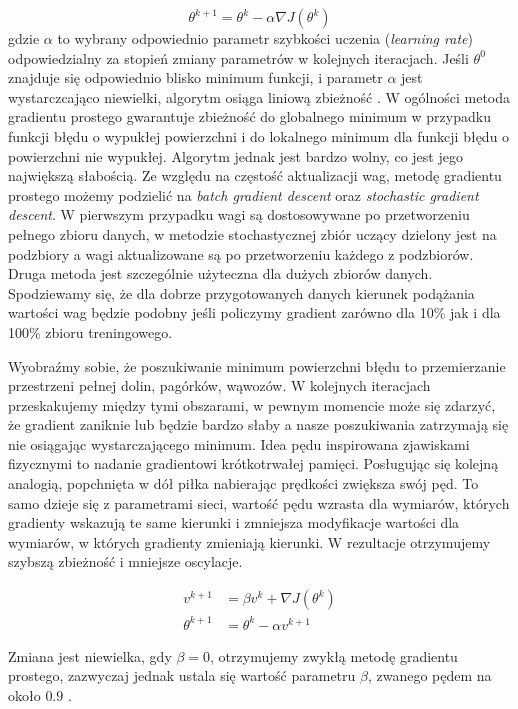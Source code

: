 \documentclass[11pt]{book}
\theoremstyle{definition}
\begin{document}
\begin{equation}
\theta^{k+1} = \theta^{k} - \alpha \nabla J(\theta^{k})
\end{equation}
gdzie $\alpha$ to wybrany odpowiednio parametr szybkości uczenia (\textit{learning rate}) odpowiedzialny za stopień zmiany parametrów w kolejnych iteracjach. Jeśli $\theta^0$ znajduje się odpowiednio blisko minimum funkcji, i parametr $\alpha$ jest wystarczcająco niewielki, algorytm osiąga liniową zbieżność \cite{Dennis:1996:NMU:1096889}. W ogólności metoda gradientu prostego gwarantuje zbieżność do globalnego minimum w przypadku funkcji błędu o wypukłej powierzchni i do lokalnego minimum dla funkcji błędu o powierzchni nie wypukłej. Algorytm jednak jest bardzo wolny, co jest jego największą słabością. Ze względu na częstość aktualizacji wag, metodę gradientu prostego możemy podzielić na \textit{batch gradient descent} oraz \textit{stochastic gradient descent}. W pierwszym przypadku wagi są dostosowywane po przetworzeniu pełnego zbioru danych, w metodzie stochastycznej zbiór uczący dzielony jest na podzbiory a wagi aktualizowane są po przetworzeniu każdego z podzbiorów. Druga metoda jest szczególnie użyteczna dla dużych zbiorów danych. Spodziewamy się, że dla dobrze przygotowanych danych kierunek podążania wartości wag będzie podobny jeśli policzymy gradient zarówno dla 10\% jak i dla 100\% zbioru treningowego.


Wyobraźmy sobie, że poszukiwanie minimum powierzchni błędu to przemierzanie przestrzeni pełnej dolin, pagórków, wąwozów. W kolejnych iteracjach przeskakujemy między tymi obszarami, w pewnym momencie może się zdarzyć, że gradient zaniknie lub będzie bardzo słaby a nasze poszukiwania zatrzymają się nie osiągając wystarczającego minimum. Idea pędu inspirowana zjawiskami fizycznymi to nadanie gradientowi krótkotrwałej pamięci. Posługując się kolejną analogią, popchnięta w dół piłka nabierając prędkości zwiększa swój pęd. To samo dzieje się z parametrami sieci, wartość pędu wzrasta dla wymiarów, których gradienty wskazują te same kierunki i zmniejsza modyfikacje wartości dla wymiarów, w których gradienty zmieniają kierunki. W rezultacje otrzymujemy szybszą zbieżność i mniejsze oscylacje.

\begin{align} 
v^{k+1} &=  \beta v^{k}+ \nabla J(\theta^{k}) \\[0.4em]
\theta^{k+1} &=  \theta^{k }- \alpha v^{k+1}
\end{align}

Zmiana jest niewielka, gdy $\beta = 0$, otrzymujemy zwykłą metodę gradientu prostego, zazwyczaj jednak ustala się wartość parametru $\beta$, zwanego pędem na około $0.9$ \cite{1986Natur.323..533R}. 
\end{document}
